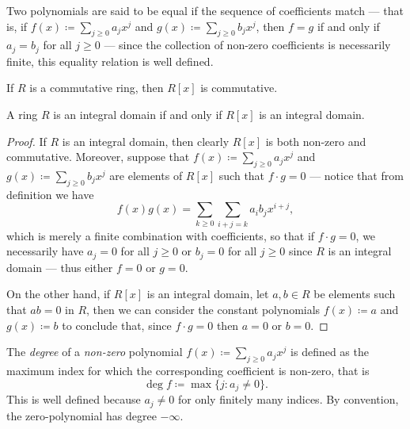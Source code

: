 Two polynomials are said to be equal if the sequence of coefficients match ---
that is, if \(f(x) \coloneq \sum_{j \geq 0} a_j x^j\) and
\(g(x) \coloneq \sum_{j \geq 0} b_j x^j\), then \(f = g\) if and only if
\(a_j = b_j\) for all \(j \geq 0\) --- since the collection of non-zero
coefficients is necessarily finite, this equality relation is well defined.

%
\begin{corollary}
    \label{cor:ring-R[x]-inherits-commutativity}
    If \(R\) is a commutative ring, then \(R[x]\) is commutative.
\end{corollary}
%

%
\begin{lemma}
    \label{lem:ring-R[x]-inherits-integral-domain}
    A ring \(R\) is an integral domain if and only if \(R[x]\) is an integral
    domain.
\end{lemma}
%

%
\begin{proof}
    If \(R\) is an integral domain, then clearly \(R[x]\) is both non-zero and
    commutative. Moreover, suppose that \(f(x) \coloneq \sum_{j \geq 0} a_j x^j\)
    and \(g(x) \coloneq \sum_{j \geq 0} b_j x^j\) are elements of \(R[x]\) such that
    \(f \cdot g = 0\) --- notice that from definition we have
    \[
        f(x) g(x) = \sum_{k \geq 0} \sum_{i + j = k} a_i b_j x^{i + j},
    \]
    which is merely a finite combination with coefficients, so that if
    \(f \cdot g = 0\), we necessarily have \(a_j = 0\) for all \(j \geq 0\) or
    \(b_j = 0\) for all \(j \geq 0\) since \(R\) is an integral domain --- thus
    either \(f = 0\) or \(g = 0\).

    On the other hand, if \(R[x]\) is an integral domain, let \(a, b \in R\) be
    elements such that \(a b = 0\) in \(R\), then we can consider the constant
    polynomials \(f(x) \coloneq a\) and \(g(x) \coloneq b\) to conclude that, since
    \(f \cdot g = 0\) then \(a = 0\) or \(b = 0\).
\end{proof}
%

%
\begin{definition}
    \label{def:degree-polynomial}
    The \emph{degree} of a \emph{non-zero} polynomial
    \(f(x) \coloneq \sum_{j \geq 0} a_j x^j\) is defined as the maximum index for
    which the corresponding coefficient is non-zero, that is
    \[
        \deg f \coloneq \max \{j \colon a_j \neq 0\}.
    \]
    This is well defined because \(a_j \neq 0\) for only finitely many indices.
    By convention, the zero-polynomial has degree \(-\infty\).
\end{definition}
%

